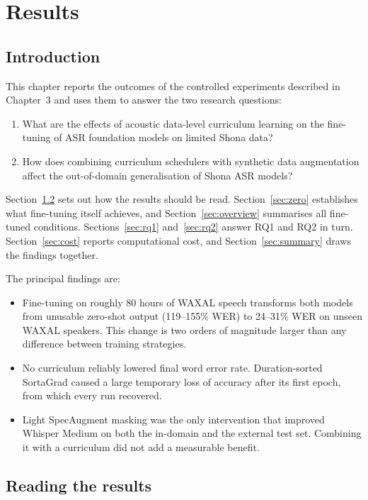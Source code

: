 \documentclass[12pt,a4paper]{report}
\begin{document}
\setcounter{chapter}{3}
\chapter{Results}
\label{chap:results}

\section{Introduction}

This chapter reports the outcomes of the controlled experiments described in
Chapter~3 and uses them to answer the two research questions:
\begin{enumerate}
\item[\textbf{RQ1}] What are the effects of acoustic data-level curriculum
learning on the fine-tuning of ASR foundation models on limited Shona data?
\item[\textbf{RQ2}] How does combining curriculum schedulers with synthetic data
augmentation affect the out-of-domain generalisation of Shona ASR models?
\end{enumerate}

Section~\ref{sec:reading} sets out how the results should be read.
Section~\ref{sec:zero} establishes what fine-tuning itself achieves, and
Section~\ref{sec:overview} summarises all fine-tuned conditions.
Sections~\ref{sec:rq1} and~\ref{sec:rq2} answer RQ1 and RQ2 in turn.
Section~\ref{sec:cost} reports computational cost, and
Section~\ref{sec:summary} draws the findings together.

The principal findings are:
\begin{itemize}
\item Fine-tuning on roughly 80 hours of WAXAL speech transforms both models from
unusable zero-shot output (119--155\% WER) to 24--31\% WER on unseen WAXAL
speakers. This change is two orders of magnitude larger than any difference
between training strategies.
\item No curriculum reliably lowered final word error rate. Duration-sorted
SortaGrad caused a large temporary loss of accuracy after its first epoch, from
which every run recovered.
\item Light SpecAugment masking was the only intervention that improved Whisper
Medium on both the in-domain and the external test set. Combining it with a
curriculum did not add a measurable benefit.
\end{itemize}

\section{Reading the results}
\label{sec:reading}
\end{document}
